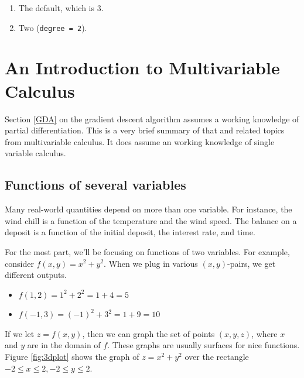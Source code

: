 \documentclass[
]{book}
\providecommand{\tightlist}{%
  \setlength{\itemsep}{0pt}\setlength{\parskip}{0pt}}
\theoremstyle{definition}
\theoremstyle{definition}
\theoremstyle{definition}
\theoremstyle{definition}
\theoremstyle{remark}
\begin{document}
\begin{enumerate}
  \begin{enumerate}
  \def\labelenumii{\alph{enumii}.}
  \tightlist
  \item
    The default, which is 3.
  \item
    Two (\texttt{degree\ =\ 2}).
  \end{enumerate}
\end{enumerate}

\appendix


\appendix

\chapter{An Introduction to Multivariable Calculus}\label{MVCA}

Section \ref{GDA} on the gradient descent algorithm assumes a working knowledge of partial differentiation. This is a very brief summary of that and related topics from multivariable calculus. It does assume an working knowledge of single variable calculus.

\section{Functions of several variables}\label{functions-of-several-variables-1}

Many real-world quantities depend on more than one variable. For instance, the wind chill is a function of the temperature and the wind speed. The balance on a deposit is a function of the initial deposit, the interest rate, and time.

For the most part, we'll be focusing on functions of two variables. For example, consider \(f(x,y)=x^2+y^2.\) When we plug in various \((x,y)\)-pairs, we get different outputs.

\begin{itemize}
\item
  \(f(1,2)=1^2+2^2=1+4=5\)
\item
  \(f(-1,3)=(-1)^2+3^2=1+9=10\)
\end{itemize}

If we let \(z=f(x,y)\), then we can graph the set of points \((x,y,z)\), where \(x\) and \(y\) are in the domain of \(f\). These graphs are usually surfaces for nice functions. Figure \ref{fig:3dplot} shows the graph of \(z=x^2+y^2\) over the rectangle \(-2\leq x\leq 2,-2\leq y\leq 2\).
\end{document}
